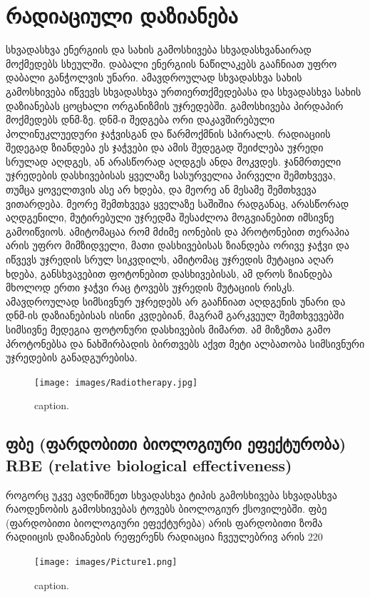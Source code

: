 \documentclass[12pt,a4paper,]{report}
\begin{document}
\chapter{რადიაციული დაზიანება}
სხვადასხვა ენერგიის და სახის გამოსხივება სხვადასხვანაირად მოქმედებს სხეულში. დაბალი ენერგიის ნაწილაკებს გააჩნიათ უფრო დაბალი განჭოლვის უნარი. ამავდროულად სხვადასხვა სახის გამოსხივება იწვევს სხვადასხვა ურთიერთქმედებასა და  სხვადასხვა სახის დაზიანებას ცოცხალი ორგანიზმის უჯრედებში. გამოსხივება პირდაპირ მოქმედებს დნმ-ზე. დნმ-ი შედგება ორი დაკავშირებული პოლინუკლუედური ჯაჭვისგან და წარმოქმნის სპირალს. რადიაციის შედეგად ზიანდება ეს ჯაჭვები და ამის შედეგად შეიძლება უჯრედი სრულად აღდგეს, ან არასწორად აღდგეს ანდა მოკვდეს. ჯანმრთელი უჯრედების დასხივებისას ყველაზე სასურველია პირველი შემთხვევა, თუმცა ყოველთვის ასე არ ხდება, და მეორე ან მესამე შემთხვევა ვითარდება. მეორე შემთხვევა ყველაზე საშიშია რადგანაც, არასწორად აღდგენილი, მუტირებული უჯრედმა შესაძლოა მოგვიანებით იმსივნე გამოიწვიოს. ამიტომაცაა რომ მძიმე იონების და პროტონებით თერაპია არის უფრო მიმზიდველი, მათი დასხივებისას ზიანდება ორივე ჯაჭვი და იწვევს უჯრედის სრულ სიკვდილს, ამიტომაც უჯრედის მუტაცია აღარ ხდება, განსხვავებით ფოტონებით დასხივებისას, ამ დროს ზიანდება მხოლოდ ერთი ჯაჭვი რაც ტოვებს უჯრედის მუტაციის რისკს. ამავდროულად სიმსივნურ უჯრედებს არ გააჩნიათ აღდგენის უნარი და დნმ-ის დაზიანებისას ისინი კვდებიან, მაგრამ გარკვეულ შემთხვევებში სიმსივნე მედეგია ფოტონური დასხივების მიმართ. ამ მიზეზთა გამო პროტონებსა და ნახშირბადის ბირთვებს აქვთ მეტი ალბათობა სიმსივნური უჯრედების განადგურებისა.

	\begin{figure}[htp]
	    \centering
        \texttt{[image: images/Radiotherapy.jpg]}
        \caption{caption.}
        \label{fig:1}
    \end{figure}

\section{ფბე (ფარდობითი ბიოლოგიური ეფექტურობა) RBE (relative biological effectiveness)} 
როგორც უკვე ავღნიშნეთ სხვადასხვა ტიპის გამოსხივება სხვადასხვა რაოდენობის გამოსხივებას ტოვებს ბიოლოგიურ ქსოვილებში. ფბე (ფარდობითი ბიოლოგიური ეფექტურება) არის ფარდობითი ზომა რადიიცის დაზიანების
რეფერენს რადიაცია ჩვეულებრივ არის 220 
	\begin{figure}[htp]
	    \centering
        \texttt{[image: images/Picture1.png]}
        \caption{caption.}
        \label{fig:1}
    \end{figure}
    
\end{document}
